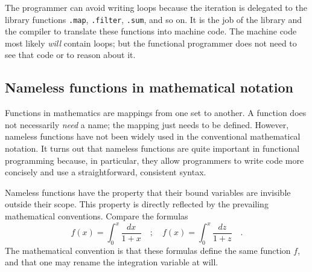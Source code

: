 The programmer can avoid writing loops because the iteration is delegated
to the library functions \lstinline!.map!, \lstinline!.filter!,
\lstinline!.sum!, and so on. It is the job of the library and the
compiler to translate these functions into machine code. The machine
code most likely \emph{will} contain loops; but the functional programmer
does not need to see that code or to reason about it.

\subsection{Nameless functions in mathematical notation}

Functions in mathematics are mappings from one set to another. A function
does not necessarily \emph{need} a name; the mapping just needs to
be defined. However, nameless functions have not been widely used
in the conventional mathematical notation. It turns out that nameless
functions are quite important in functional programming because, in
particular, they allow programmers to write code more concisely and
use a straightforward, consistent syntax.

Nameless functions have the property that their bound variables are
invisible outside their scope. This property is directly reflected
by the prevailing mathematical conventions. Compare the formulas
\[
f\left(x\right)=\int_{0}^{x}\frac{dx}{1+x}\quad;\quad f\left(x\right)=\int_{0}^{x}\frac{dz}{1+z}\quad.
\]
The mathematical convention is that these formulas define the same
function $f$, and that one may rename the integration variable at
will.

